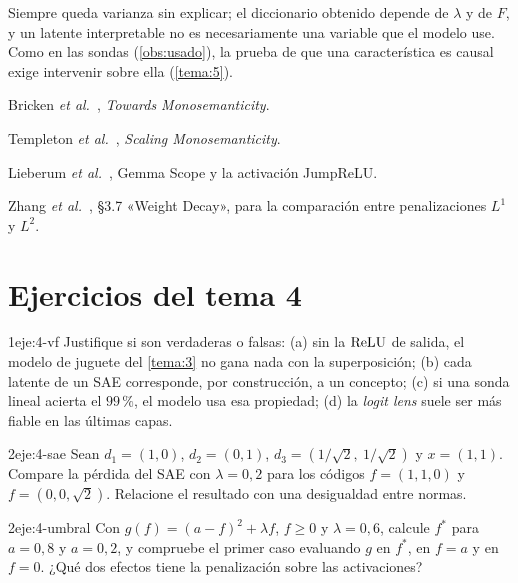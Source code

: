 \begin{observacion}[Límites]\label{obs:limites-sae}
Siempre queda varianza sin explicar; el diccionario obtenido depende de $\lambda$ y de $F$, y un latente interpretable no es necesariamente una variable que el modelo use. Como en las sondas (\cref{obs:usado}), la prueba de que una característica es causal exige intervenir sobre ella (\cref{tema:5}).
\end{observacion}

\begin{lecturas}
\item Bricken \emph{et al.}~\cite{bricken}, \emph{Towards Monosemanticity}.
\item Templeton \emph{et al.}~\cite{templeton}, \emph{Scaling Monosemanticity}.
\item Lieberum \emph{et al.}~\cite{gemmascope}, Gemma Scope y la activación JumpReLU.
\item Zhang \emph{et al.}~\cite{d2l}, §3.7 «Weight Decay», para la comparación entre penalizaciones $L^{1}$ y $L^{2}$.
\end{lecturas}

\section*{Ejercicios del tema 4}

\begin{ejercicio}{1}{eje:4-vf}
Justifique si son verdaderas o falsas: (a) sin la $\operatorname{ReLU}$ de salida, el modelo de juguete del \cref{tema:3} no gana nada con la superposición; (b) cada latente de un SAE corresponde, por construcción, a un concepto; (c) si una sonda lineal acierta el $99\,\%$, el modelo usa esa propiedad; (d) la \emph{logit lens} suele ser más fiable en las últimas capas.
\end{ejercicio}

\begin{ejercicio}{2}{eje:4-sae}
Sean $d_1=(1,0)$, $d_2=(0,1)$, $d_3=(1/\sqrt2,\ 1/\sqrt2)$ y $x=(1,1)$. Compare la pérdida del SAE con $\lambda=0{,}2$ para los códigos $f=(1,1,0)$ y $f=(0,0,\sqrt2)$. Relacione el resultado con una desigualdad entre normas.
\end{ejercicio}

\begin{ejercicio}{2}{eje:4-umbral}
Con $g(f)=(a-f)^{2}+\lambda f$, $f\ge 0$ y $\lambda=0{,}6$, calcule $f^{*}$ para $a=0{,}8$ y $a=0{,}2$, y compruebe el primer caso evaluando $g$ en $f^{*}$, en $f=a$ y en $f=0$. ¿Qué dos efectos tiene la penalización sobre las activaciones?
\end{ejercicio}

